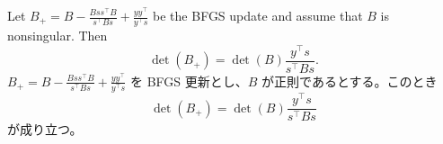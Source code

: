 \documentclass[0_main]{subfiles}
\begin{document}
\begin{proposition}\label{prop:bfgs-determinant}
    \ifEn
        Let $B_{+} = B - \frac{Bss^\top B}{s^\top Bs} + \frac{yy^\top}{y^\top s}$ be the BFGS update and assume that $B$ is nonsingular. Then
        \begin{equation*}
            \det(B_{+}) = \det(B) \frac{y^\top s}{s^\top Bs}.
        \end{equation*}
    \else
        $B_{+} = B - \frac{Bss^\top B}{s^\top Bs} + \frac{yy^\top}{y^\top s}$ を BFGS 更新とし、$B$ が正則であるとする。このとき
        \begin{equation*}
            \det(B_{+}) = \det(B) \frac{y^\top s}{s^\top Bs}
        \end{equation*}
        が成り立つ。
    \fi
\end{proposition}
\end{document}
